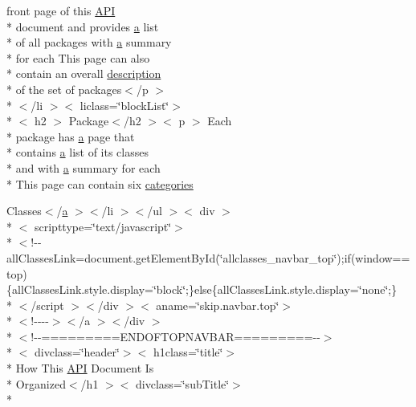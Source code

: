 \begin{DoxyCompactItemize}
front page of this \hyperlink{help-doc_8html_a7d3f9452f8a4b1b494eade1a77016691}{A\-P\-I} \\*
document and provides \hyperlink{style_8css_a5e8981582017bb8b84c21f148345d1f7}{a} list \\*
of all packages with \hyperlink{style_8css_a5e8981582017bb8b84c21f148345d1f7}{a} summary \\*
for each This page can also \\*
contain an overall \hyperlink{_cloudia_d_b_8html_a2661f439a4a94ffdcd5e47ae1da0bb1d}{description} \\*
of the set of packages$<$/p $>$\\*
$<$/li $>$$<$ liclass=\char`\"{}block\-List\char`\"{}$>$\\*
$<$ h2 $>$ Package$<$/h2 $>$$<$ p $>$ Each \\*
package has \hyperlink{style_8css_a5e8981582017bb8b84c21f148345d1f7}{a} page that \\*
contains \hyperlink{style_8css_a5e8981582017bb8b84c21f148345d1f7}{a} list of its classes \\*
and with \hyperlink{style_8css_a5e8981582017bb8b84c21f148345d1f7}{a} summary for each \\*
This page can contain six \hyperlink{help-doc_8html_a11477b189247b7b79e09770d044c6b82}{categories}
\item 
Classes$<$/\hyperlink{style_8css_a5e8981582017bb8b84c21f148345d1f7}{a} $>$$<$/li $>$$<$/ul $>$$<$ div $>$\\*
$<$ scripttype=\char`\"{}text/javascript\char`\"{}$>$\\*
$<$!-\/-\/all\-Classes\-Link=document.\-get\-Element\-By\-Id(\char`\"{}allclasses\-\_\-navbar\-\_\-top\char`\"{});if(window==top)\{all\-Classes\-Link.\-style.\-display=\char`\"{}block\char`\"{};\}else\{all\-Classes\-Link.\-style.\-display=\char`\"{}none\char`\"{};\}\\*
$<$/script $>$$<$/div $>$$<$ aname=\char`\"{}skip.\-navbar.\-top\char`\"{}$>$\\*
$<$!-\/-\/-\/-\/$>$$<$/a $>$$<$/div $>$\\*
$<$!-\/-\/=========E\-N\-D\-O\-F\-T\-O\-P\-N\-A\-V\-B\-A\-R=========-\/-\/$>$\\*
$<$ divclass=\char`\"{}header\char`\"{}$>$$<$ h1class=\char`\"{}title\char`\"{}$>$\\*
 How This \hyperlink{help-doc_8html_a7d3f9452f8a4b1b494eade1a77016691}{A\-P\-I} Document Is \\*
Organized$<$/h1 $>$$<$ divclass=\char`\"{}sub\-Title\char`\"{}$>$\\*
$$
\end{DoxyCompactItemize}

